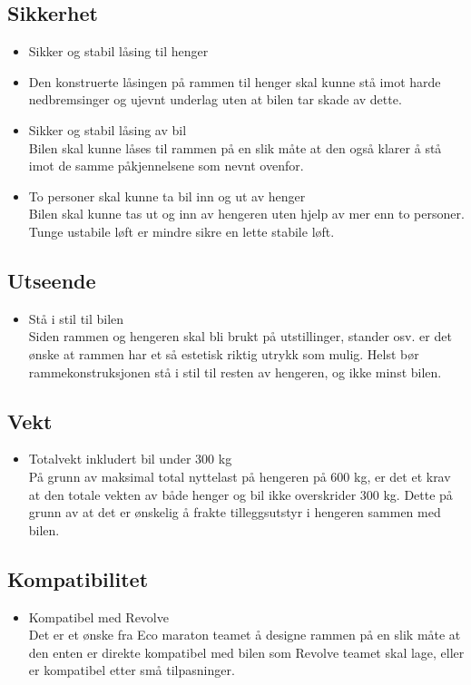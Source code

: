 \subsection{Sikkerhet}
\begin{itemize}
\item Sikker og stabil låsing til henger \\
\item Den konstruerte låsingen på rammen til henger skal kunne stå imot harde nedbremsinger og ujevnt underlag uten at bilen tar skade av dette.  
\item Sikker og stabil låsing av bil \\
Bilen skal kunne låses til rammen på en slik måte at den også klarer å stå imot de samme påkjennelsene som nevnt ovenfor.
\item To personer skal kunne ta bil inn og ut av henger \\
Bilen skal kunne tas ut og inn av hengeren uten hjelp av mer enn to personer. Tunge ustabile løft er mindre sikre en lette stabile løft.  
\end{itemize}
\subsection{Utseende}
\begin{itemize}
\item Stå i stil til bilen \\
Siden rammen og hengeren skal bli brukt på utstillinger, stander osv. er det ønske at rammen har et så estetisk riktig utrykk som mulig. Helst bør rammekonstruksjonen stå i stil til resten av hengeren, og ikke minst bilen. 
\end{itemize}
\subsection{Vekt}
\begin{itemize}
\item Totalvekt inkludert bil under 300 kg \\
På grunn av maksimal total nyttelast på hengeren på 600 kg, er det et krav at den totale vekten av både henger og bil ikke overskrider 300 kg. Dette på grunn av at det er ønskelig å frakte tilleggsutstyr i hengeren sammen med bilen.  
\end{itemize}
\subsection{Kompatibilitet}
\begin{itemize}
\item Kompatibel med Revolve \\
Det er et ønske fra Eco maraton teamet å designe rammen på en slik måte at den enten er direkte kompatibel med bilen som Revolve teamet skal lage, eller er kompatibel etter små tilpasninger. 
\end{itemize}
